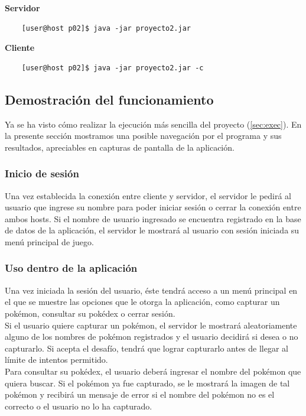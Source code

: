 \documentclass[12pt]{article}
\begin{document}
\noindent
\textbf{Servidor}\\
\begin{verbatim}
    [user@host p02]$ java -jar proyecto2.jar
\end{verbatim}
\textbf{Cliente}
\begin{verbatim}
    [user@host p02]$ java -jar proyecto2.jar -c
\end{verbatim}

\subsection{Demostración del funcionamiento}
Ya se ha visto cómo realizar la ejecución más sencilla del proyecto (\ref{sec:exec}). En la presente sección mostramos una posible navegación por el programa y sus resultados, apreciables en capturas de pantalla de la aplicación.
\subsubsection{Inicio de sesión}
Una vez establecida la conexión entre cliente y servidor, el servidor le pedirá al usuario que ingrese su nombre para poder iniciar sesión o cerrar la conexión entre ambos hosts. Si el nombre de usuario ingresado se encuentra registrado en la base de datos de la aplicación, el servidor le mostrará al usuario con sesión iniciada su menú principal de juego.

\subsubsection{Uso dentro de la aplicación}
Una vez iniciada la sesión del usuario, éste tendrá acceso a un menú principal en el que se muestre las opciones que le otorga la aplicación, como capturar un pokémon, consultar su pokédex o cerrar sesión. \\

Si el usuario quiere capturar un pokémon, el servidor le mostrará aleatoriamente alguno de los nombres de pokémon registrados y el usuario decidirá si desea o no capturarlo. Si acepta el desafío, tendrá que lograr capturarlo antes de llegar al límite de intentos permitido. \\

Para consultar su pokédex, el usuario deberá ingresar el nombre del pokémon que quiera buscar. Si el pokémon ya fue capturado, se le mostrará la imagen de tal pokémon y recibirá un mensaje de error si el nombre del pokémon no es el correcto o el usuario no lo ha capturado. \\
\end{document}
